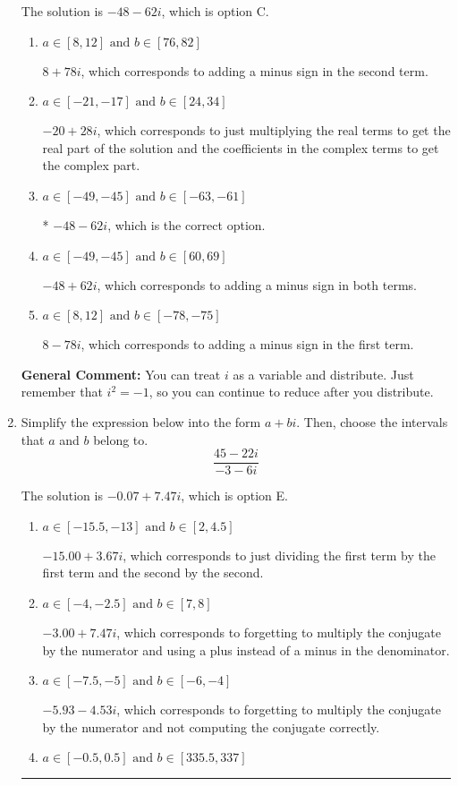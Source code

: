 \documentclass{extbook}[14pt]
\newcommand{\litem}[1]{\item #1

\rule{\textwidth}{0.4pt}}
\begin{document}
\begin{enumerate}
{The solution is \( -48 - 62 i \), which is option C.\begin{enumerate}[label=\Alph*.]
\item \( a \in [8, 12] \text{ and } b \in [76, 82] \)

 $8 + 78 i$, which corresponds to adding a minus sign in the second term.
\item \( a \in [-21, -17] \text{ and } b \in [24, 34] \)

 $-20 + 28 i$, which corresponds to just multiplying the real terms to get the real part of the solution and the coefficients in the complex terms to get the complex part.
\item \( a \in [-49, -45] \text{ and } b \in [-63, -61] \)

* $-48 - 62 i$, which is the correct option.
\item \( a \in [-49, -45] \text{ and } b \in [60, 69] \)

 $-48 + 62 i$, which corresponds to adding a minus sign in both terms.
\item \( a \in [8, 12] \text{ and } b \in [-78, -75] \)

 $8 - 78 i$, which corresponds to adding a minus sign in the first term.
\end{enumerate}

\textbf{General Comment:} You can treat $i$ as a variable and distribute. Just remember that $i^2=-1$, so you can continue to reduce after you distribute.
}
\litem{
Simplify the expression below into the form $a+bi$. Then, choose the intervals that $a$ and $b$ belong to.
\[ \frac{45 - 22 i}{-3 - 6 i} \]

The solution is \( -0.07  + 7.47 i \), which is option E.\begin{enumerate}[label=\Alph*.]
\item \( a \in [-15.5, -13] \text{ and } b \in [2, 4.5] \)

 $-15.00  + 3.67 i$, which corresponds to just dividing the first term by the first term and the second by the second.
\item \( a \in [-4, -2.5] \text{ and } b \in [7, 8] \)

 $-3.00  + 7.47 i$, which corresponds to forgetting to multiply the conjugate by the numerator and using a plus instead of a minus in the denominator.
\item \( a \in [-7.5, -5] \text{ and } b \in [-6, -4] \)

 $-5.93  - 4.53 i$, which corresponds to forgetting to multiply the conjugate by the numerator and not computing the conjugate correctly.
\item \( a \in [-0.5, 0.5] \text{ and } b \in [335.5, 337] \)


\end{enumerate}}
\end{enumerate}
\end{document}
